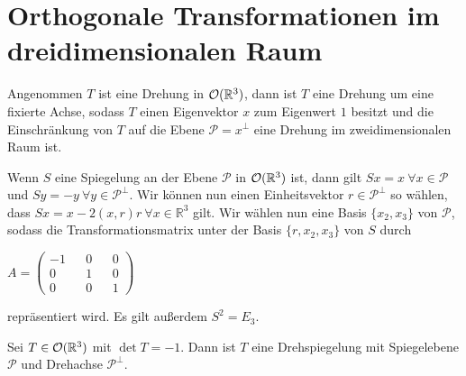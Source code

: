 \section{Orthogonale Transformationen im dreidimensionalen Raum}
\begin{theorem}
 Angenommen $T$ ist eine Drehung in ${\mathcal{O}(\mathbb{R}^3)}$, dann ist $T$ eine Drehung um eine fixierte Achse, sodass $T$ einen Eigenvektor $x$ zum Eigenwert $1$ besitzt und die Einschränkung von $T$ auf die Ebene $\mathcal{P}=x^{\perp}$ eine Drehung im zweidimensionalen Raum ist.
\end{theorem}
\begin{bem}
 Wenn $S$ eine Spiegelung an der Ebene $\mathcal{P}$ in ${\mathcal{O}(\mathbb{R}^3)}$ ist, dann gilt $Sx=x \ \forall x \in \mathcal{P}$ und $Sy=-y \ \forall y \in \mathcal{P}^{\perp}$. Wir können nun einen Einheitsvektor $r \in \mathcal{P}^{\perp}$ so wählen, dass $Sx=x-2(x,r)r \ \forall x\in \mathbb{R}^3$ gilt. Wir wählen nun eine Basis $\{x_2,x_3\}$ von $\mathcal{P}$, sodass die Transformationsmatrix unter der Basis $\{r,x_2,x_3\}$ von $S$ durch 
 \begin{center}
  $A= \begin{pmatrix}
        -1 && 0 && 0 \\
        0 && 1 && 0 \\
        0 && 0 && 1 
       \end{pmatrix}$
 \end{center}
repräsentiert wird. Es gilt außerdem $S^2 = E_3$.
\end{bem}
\begin{theorem}
 Sei $T\in{\mathcal{O}(\mathbb{R}^3)}$ mit $\det T = -1$. Dann ist $T$ eine Drehspiegelung mit Spiegelebene $\mathcal{P}$ und Drehachse $\mathcal{P}^{\perp}$.
\end{theorem}
